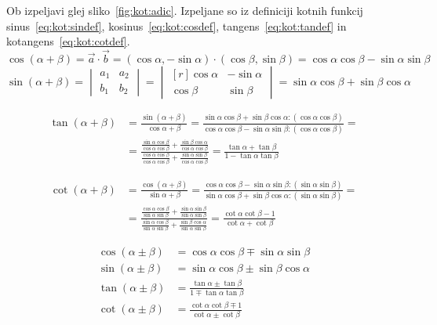 \documentclass[a4paper,oneside,12pt,fleqn]{article}
\newcommand\krat\cdot
\def\kos{\cos}
\numberwithin{equation}{section}
\begin{document}
Ob izpeljavi glej sliko~\ref{fig:kot:adic}. Izpeljane so iz definiciji kotnih funkcij
sinus~\eqref{eq:kot:sindef}, kosinus~\eqref{eq:kot:cosdef}, tangens~\eqref{eq:kot:tandef} in
kotangens~\eqref{eq:kot:cotdef}.
\[\kos(\alpha+\beta) = \vec{a}\krat\vec{b} = (\kos\alpha, -\sin\alpha)\krat(\kos\beta,
\sin\beta) = \kos\alpha\kos\beta - \sin\alpha\sin\beta \]
\[\sin(\alpha+\beta) = \begin{vmatrix} a_1 & a_2 \\ b_1 & b_2 \end{vmatrix} =
  \begin{vmatrix*}[r] \kos\alpha & -\sin\alpha \\ \kos\beta & \sin\beta \end{vmatrix*} =
  \sin\alpha\kos\beta + \sin\beta\kos\alpha \]

\begin{align*} \tan(\alpha+\beta) &= \frac{\sin(\alpha+\beta)}{\kos\alpha+\beta} =
\frac{\sin\alpha\kos\beta+\sin\beta\kos\alpha :(\kos\alpha\kos\beta)}{\kos\alpha\kos\beta
- \sin\alpha\sin\beta :(\kos\alpha\kos\beta)} =\\&=
\frac{\frac{\sin\alpha\kos\beta}{\kos\alpha\kos\beta}+\frac{\sin\beta\kos\alpha}{\kos\alpha\kos\beta}}
{\frac{\kos\alpha\kos\beta}{\kos\alpha\kos\beta}+\frac{\sin\alpha\sin\beta}{\kos\alpha\kos\beta}}
= \frac{\tan\alpha+\tan\beta}{1-\tan\alpha\tan\beta} \end{align*}

\begin{align*} \cot(\alpha+\beta) &= \frac{\kos(\alpha+\beta)}{\sin\alpha+\beta} =
\frac{\kos\alpha\kos\beta-\sin\alpha\sin\beta :(\sin\alpha\sin\beta)}{\sin\alpha\kos\beta
+ \sin\beta\kos\alpha :(\sin\alpha\sin\beta)} =\\&=
\frac{\frac{\kos\alpha\kos\beta}{\sin\alpha\sin\beta}+\frac{\sin\alpha\sin\beta}{\sin\alpha\sin\beta}}
{\frac{\sin\alpha\kos\beta}{\sin\alpha\sin\beta}+\frac{\sin\beta\kos\alpha}{\sin\alpha\sin\beta}}
= \frac{\cot\alpha\cot\beta-1}{\cot\alpha+\cot\beta} \end{align*}

\boldmath
\begin{align}
  \kos(\alpha\pm\beta) &= \kos\alpha\kos\beta \mp \sin\alpha\sin\beta \label{eq:kot:adic:cos} \\
  \sin(\alpha\pm\beta) &= \sin\alpha\kos\beta \pm \sin\beta\kos\alpha \label{eq:kot:adic:sin} \\
  \tan(\alpha\pm\beta) &= \frac{\tan\alpha \pm \tan\beta}{1 \mp \tan\alpha\tan\beta} \label{eq:kot:adic:tan} \\
  \cot(\alpha\pm\beta) &= \frac{\cot\alpha\cot\beta \mp 1}{\cot\alpha \pm \cot\beta} \label{eq:kot:adic:cot}
\end{align}
\unboldmath
\end{document}
